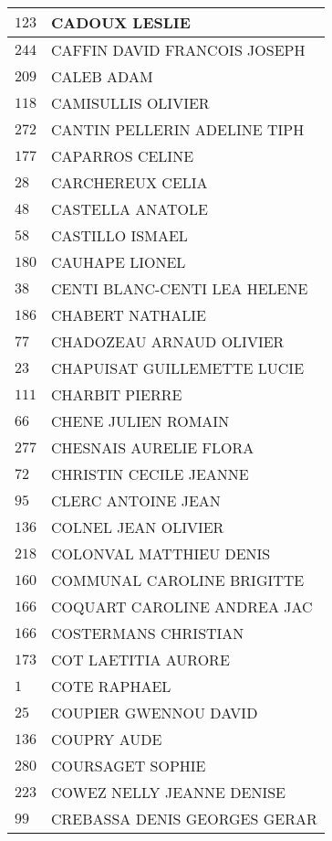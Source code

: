 \begin{xltabular}{\linewidth}{|l|X|}
    \hline
    $123$ & CADOUX LESLIE \\
    \hline
    $244$ & CAFFIN DAVID FRANCOIS JOSEPH \\
    \hline
    $209$ & CALEB ADAM \\
    \hline
    $118$ & CAMISULLIS OLIVIER \\
    \hline
    $272$ & CANTIN PELLERIN ADELINE TIPH \\
    \hline
    $177$ & CAPARROS CELINE \\
    \hline
    $28$ & CARCHEREUX CELIA \\
    \hline
    $48$ & CASTELLA ANATOLE \\
    \hline
    $58$ & CASTILLO ISMAEL \\
    \hline
    $180$ & CAUHAPE LIONEL \\
    \hline
    $38$ & CENTI BLANC-CENTI LEA HELENE \\
    \hline
    $186$ & CHABERT NATHALIE \\
    \hline
    $77$ & CHADOZEAU ARNAUD OLIVIER \\
    \hline
    $23$ & CHAPUISAT GUILLEMETTE LUCIE \\
    \hline
    $111$ & CHARBIT PIERRE \\
    \hline
    $66$ & CHENE JULIEN ROMAIN \\
    \hline
    $277$ & CHESNAIS AURELIE FLORA \\
    \hline
    $72$ & CHRISTIN CECILE JEANNE \\
    \hline
    $95$ & CLERC ANTOINE JEAN \\
    \hline
    $136$ & COLNEL JEAN OLIVIER \\
    \hline
    $218$ & COLONVAL MATTHIEU DENIS \\
    \hline
    $160$ & COMMUNAL CAROLINE BRIGITTE \\
    \hline
    $166$ & COQUART CAROLINE ANDREA JAC \\
    \hline
    $166$ & COSTERMANS CHRISTIAN \\
    \hline
    $173$ & COT LAETITIA AURORE \\
    \hline
    $1$ & COTE RAPHAEL \\
    \hline
    $25$ & COUPIER GWENNOU DAVID \\
    \hline
    $136$ & COUPRY AUDE \\
    \hline
    $280$ & COURSAGET SOPHIE \\
    \hline
    $223$ & COWEZ NELLY JEANNE DENISE \\
    \hline
    $99$ & CREBASSA DENIS GEORGES GERAR \\

\end{xltabular}
